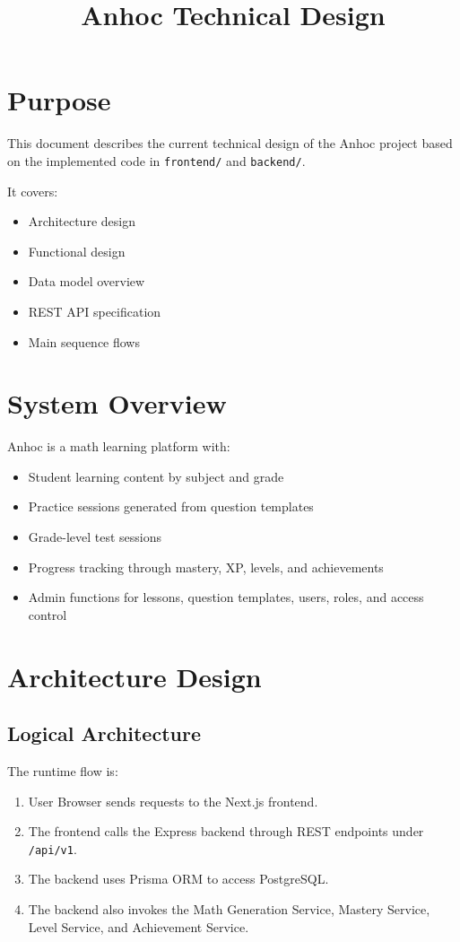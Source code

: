 \documentclass[11pt,a4paper]{article}
\title{Anhoc Technical Design}
\date{}
\newcommand{\docpath}[1]{\texttt{#1}}
\begin{document}
\maketitle
\tableofcontents
\newpage

\section{Purpose}

This document describes the current technical design of the Anhoc project based on the implemented code in \docpath{frontend/} and \docpath{backend/}.

It covers:
\begin{itemize}[leftmargin=1.5em]
  \item Architecture design
  \item Functional design
  \item Data model overview
  \item REST API specification
  \item Main sequence flows
\end{itemize}

\section{System Overview}

Anhoc is a math learning platform with:
\begin{itemize}[leftmargin=1.5em]
  \item Student learning content by subject and grade
  \item Practice sessions generated from question templates
  \item Grade-level test sessions
  \item Progress tracking through mastery, XP, levels, and achievements
  \item Admin functions for lessons, question templates, users, roles, and access control
\end{itemize}

\section{Architecture Design}

\subsection{Logical Architecture}

The runtime flow is:
\begin{enumerate}[leftmargin=1.5em]
  \item User Browser sends requests to the Next.js frontend.
  \item The frontend calls the Express backend through REST endpoints under \docpath{/api/v1}.
  \item The backend uses Prisma ORM to access PostgreSQL.
  \item The backend also invokes the Math Generation Service, Mastery Service, Level Service, and Achievement Service.
\end{enumerate}
\end{document}
